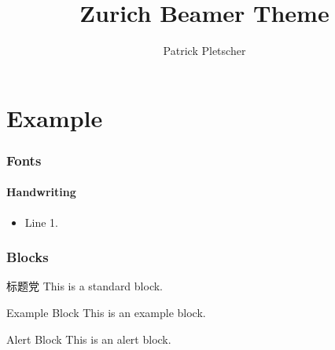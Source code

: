 \documentclass[11 pt,t]{beamer}
\author{Patrick Pletscher}
\title{Zurich Beamer Theme}
\begin{document}
\frame{

\titlepage

}
\begin{frame}
	\tableofcontents
\end{frame}

\section{Example}


\begin{frame}
\frametitle{Fonts}
\framesubtitle{Handwriting}

\begin{itemize}
    \item Line 1.
\end{itemize}


\end{frame}


\begin{frame}
\frametitle{Blocks}

\begin{block}{标题党}
    This is a standard block.
\end{block}

\begin{exampleblock}{Example Block}
    This is an example block.
\end{exampleblock}

\begin{alertblock}{Alert Block}
    This is an alert block.
\end{alertblock}



\end{frame}
\end{document}
